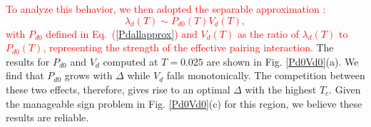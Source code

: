 \documentclass[reprint,nofootinbib,nobibnotes,amsmath,amssymb,aps,prb,floatfix]{revtex4-1}
\newcommand{\beq}{\begin{equation}}
\newcommand{\eeq}{\end{equation}}
\newcommand{\figdisp}[1]{Fig. \ref{#1}}
\begin{document}
\textcolor{red}{To analyze this behavior, we then adopted the separable approximation \cite{maier6,maier5}:
\beq\nonumber
\lambda_d(T) \sim P_{d0}(T) V_d(T),
\eeq
 with $P_{d0}$ defined in Eq.~(\ref{Pdallapprox}) and
$V_d(T)$ as the ratio of $\lambda_d(T)$ to $P_{d0}(T)$,
representing the strength of the effective pairing interaction.} %
The results for $P_{d0}$ and $V_d$ computed at $T=0.025$ are shown in \figdisp{Pd0Vd0}(a). We find that $P_{d0}$ grows with $\Delta$ while $V_d$ falls monotonically. The competition between these two effects, therefore, gives rise to an optimal $\Delta$ with the highest $T_c$. Given the manageable sign problem in \figdisp{Pd0Vd0}(c) for this region, we believe these results are reliable.
\end{document}
